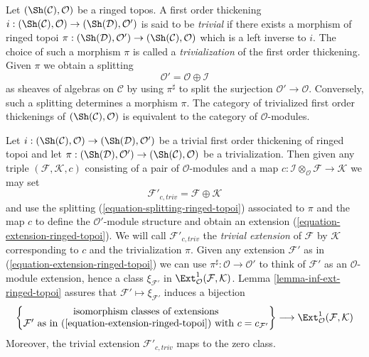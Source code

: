 \begin{remark}
\label{remark-trivial-thickening-ringed-topoi}
Let $(\Sh(\mathcal{C}), \mathcal{O})$ be a ringed topos. A first order
thickening $i : (\Sh(\mathcal{C}), \mathcal{O}) \to
(\Sh(\mathcal{D}), \mathcal{O}')$ is said
to be {\it trivial} if there exists a morphism of ringed topoi
$\pi : (\Sh(\mathcal{D}), \mathcal{O}') \to (\Sh(\mathcal{C}), \mathcal{O})$
which is a left inverse to $i$. The choice of such a morphism
$\pi$ is called a {\it trivialization} of the first order thickening.
Given $\pi$ we obtain a splitting
\begin{equation}
\label{equation-splitting-ringed-topoi}
\mathcal{O}' = \mathcal{O} \oplus \mathcal{I}
\end{equation}
as sheaves of algebras on $\mathcal{C}$ by using $\pi^\sharp$
to split the surjection $\mathcal{O}' \to \mathcal{O}$.
Conversely, such a splitting determines
a morphism $\pi$. The category of trivialized first order thickenings of
$(\Sh(\mathcal{C}), \mathcal{O})$ is equivalent to the category of 
$\mathcal{O}$-modules.
\end{remark}

\begin{remark}
\label{remark-trivial-extension-ringed-topoi}
Let $i : (\Sh(\mathcal{C}), \mathcal{O}) \to (\Sh(\mathcal{D}), \mathcal{O}')$
be a trivial first order thickening of ringed topoi
and let $\pi : (\Sh(\mathcal{D}), \mathcal{O}') \to
(\Sh(\mathcal{C}), \mathcal{O})$ be a trivialization. Then given any triple
$(\mathcal{F}, \mathcal{K}, c)$ consisting of a pair of
$\mathcal{O}$-modules and a map
$c : \mathcal{I} \otimes_\mathcal{O} \mathcal{F} \to \mathcal{K}$
we may set
$$
\mathcal{F}'_{c, triv} = \mathcal{F} \oplus \mathcal{K}
$$
and use the splitting (\ref{equation-splitting-ringed-topoi})
associated to $\pi$ and the map $c$ to define the $\mathcal{O}'$-module
structure and obtain an extension (\ref{equation-extension-ringed-topoi}).
We will call $\mathcal{F}'_{c, triv}$ the {\it trivial extension} of
$\mathcal{F}$ by $\mathcal{K}$ corresponding
to $c$ and the trivialization $\pi$. Given any extension
$\mathcal{F}'$ as in (\ref{equation-extension-ringed-topoi}) we can use
$\pi^\sharp : \mathcal{O} \to \mathcal{O}'$ to think of $\mathcal{F}'$
as an $\mathcal{O}$-module extension, hence a class $\xi_{\mathcal{F}'}$
in $\Ext^1_\mathcal{O}(\mathcal{F}, \mathcal{K})$.
Lemma \ref{lemma-inf-ext-ringed-topoi} assures that
$\mathcal{F}' \mapsto \xi_{\mathcal{F}'}$
induces a bijection
$$
\left\{
\begin{matrix}
\text{isomorphism classes of extensions}\\
\mathcal{F}'\text{ as in (\ref{equation-extension-ringed-topoi}) with }
c = c_{\mathcal{F}'}
\end{matrix}
\right\}
\longrightarrow
\Ext^1_\mathcal{O}(\mathcal{F}, \mathcal{K})
$$
Moreover, the trivial extension $\mathcal{F}'_{c, triv}$ maps to the zero class.
\end{remark}

